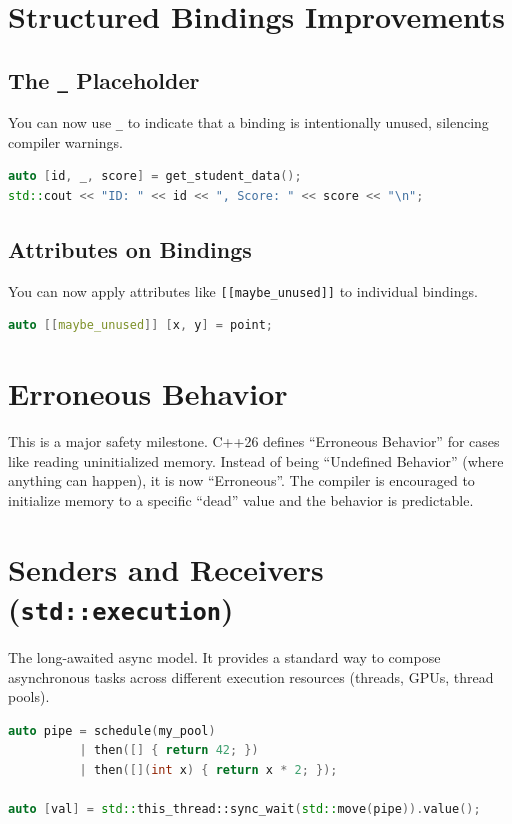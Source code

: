 \section{Structured Bindings Improvements}

\subsection{The \texttt{\_} Placeholder}
You can now use \texttt{\_} to indicate that a binding is intentionally unused, silencing compiler warnings.

\begin{lstlisting}[language=C++]
auto [id, _, score] = get_student_data();
std::cout << "ID: " << id << ", Score: " << score << "\n";
\end{lstlisting}

\subsection{Attributes on Bindings}
You can now apply attributes like \texttt{[[maybe\_unused]]} to individual bindings.

\begin{lstlisting}[language=C++]
auto [[maybe_unused]] [x, y] = point;
\end{lstlisting}

\section{Erroneous Behavior}

This is a major safety milestone. C++26 defines ``Erroneous Behavior'' for cases like reading uninitialized memory. Instead of being ``Undefined Behavior'' (where anything can happen), it is now ``Erroneous''. The compiler is encouraged to initialize memory to a specific ``dead'' value and the behavior is predictable.

\section{Senders and Receivers (\texttt{std::execution})}

The long-awaited async model. It provides a standard way to compose asynchronous tasks across different execution resources (threads, GPUs, thread pools).

\begin{lstlisting}[language=C++]
auto pipe = schedule(my_pool)
          | then([] { return 42; })
          | then([](int x) { return x * 2; });

auto [val] = std::this_thread::sync_wait(std::move(pipe)).value();
\end{lstlisting}

